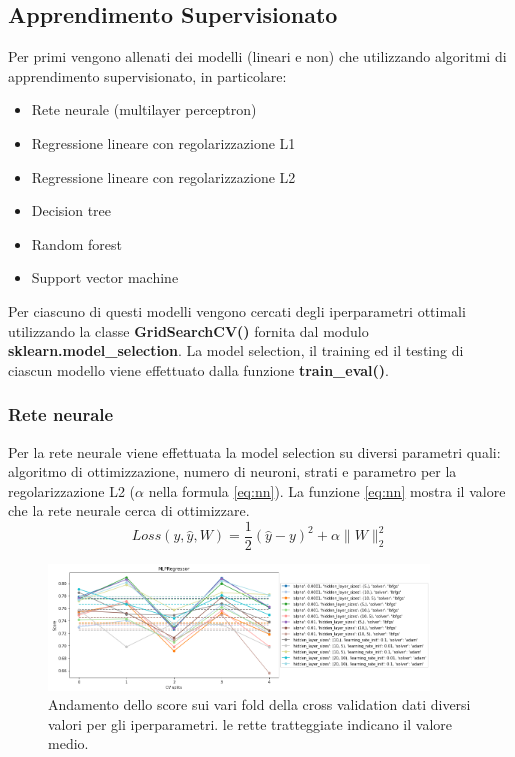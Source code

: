 \documentclass{article}
\begin{document}
\subsection{Apprendimento Supervisionato}
Per primi vengono allenati dei modelli (lineari e non) che utilizzando
algoritmi di apprendimento supervisionato, in particolare:
\begin{itemize}
	\itemsep0em
	\item Rete neurale (multilayer perceptron)
	\item Regressione lineare con regolarizzazione L1
	\item Regressione lineare con regolarizzazione L2
	\item Decision tree
	\item Random forest
	\item Support vector machine
\end{itemize}
Per ciascuno di questi modelli vengono cercati degli iperparametri ottimali
utilizzando la classe \textbf{GridSearchCV()} fornita dal modulo
\textbf{sklearn.model\_selection}.
La model selection, il training ed il testing di ciascun modello viene
effettuato dalla funzione \textbf{train\_eval()}.

\subsubsection{Rete neurale}
Per la rete neurale viene effettuata la model selection su diversi parametri
quali: algoritmo di ottimizzazione, numero di neuroni, strati e parametro per
la regolarizzazione L2 ($\alpha$ nella formula \ref{eq:nn}). La funzione
\ref{eq:nn} mostra il valore che la rete neurale cerca di ottimizzare.
\begin{equation}
	Loss(y, \hat{y}, W)=\frac{1}{2}(\hat{y}-y)^2 + \alpha\|W\|^2_2
	\label{eq:nn}
\end{equation}
\begin{figure}[ht]
	\centering
	\includegraphics[width=0.9\textwidth]{nncv.png}
	\caption{Andamento dello score sui vari fold della cross validation dati
	diversi valori per gli iperparametri. le rette tratteggiate indicano il
	valore medio.}
\end{figure}
\end{document}
